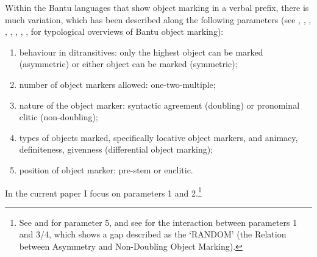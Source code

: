 \documentclass[output=paper
,modfonts
,nonflat]{langsci/langscibook}
\begin{document}
Within the Bantu languages that show object marking in a verbal prefix, there is much variation, which has been described along the following parameters (see \citealt{Zeller2014}, \citealt{Marlo2015}, \citealt{Marten_Kula2012}, \citealt{Riedel2009}, \citealt{Marten_et_al2007}, \citealt{Beaudoin-Lietz_et_al2004}, \citealt{Morimoto2002}, \citealt{Polak1986}, \citealt{Hyman_Duranti1982} for typological overviews of Bantu object marking):
\begin{enumerate}
\item[1.]behaviour in ditransitives: only the highest object can be marked (asymmetric) or either object can be marked (symmetric); 
\item[2.]number of object markers allowed: one-two-multiple;
\item[3.]nature of the object marker: syntactic agreement (doubling) or pronominal clitic (non-doubling);
\item[4.]types of objects marked, specifically locative object markers, and animacy, definiteness, givenness (differential object marking);
\item [5.]position of object marker: pre-stem or enclitic.
\end{enumerate}
In the current paper I focus on parameters 1 and 2.\footnote{See \citet{Beaudoin-Lietz_et_al2004} and \citet{Marlo2015} for parameter 5, and see \citet{Van_der_Wal2017b} for the interaction between parameters 1 and 3/4, which shows a gap described as the ‘RANDOM’ (the Relation between Asymmetry and Non-Doubling Object Marking).} 
\end{document}
